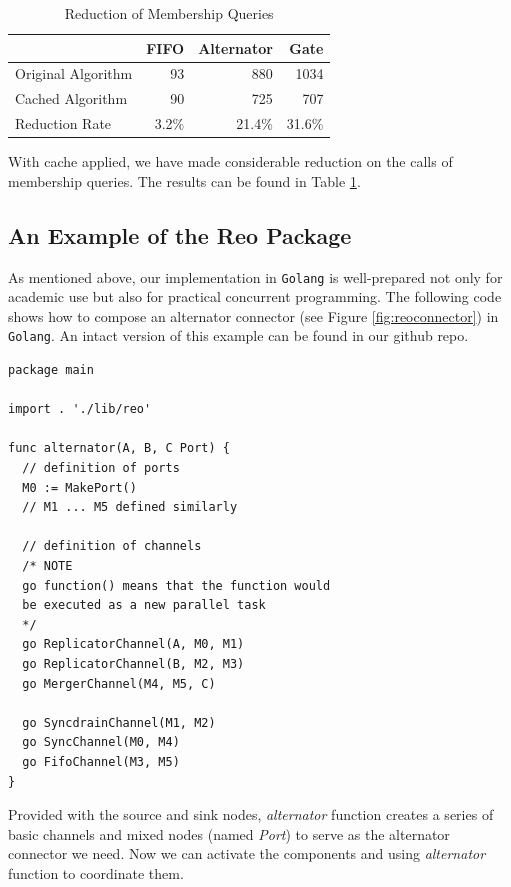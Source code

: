 \documentclass[conference, a4paper]{IEEEtran}
\begin{document}
\begin{table}[ht]
  \renewcommand{\arraystretch}{1.3}
  \caption{Reduction of Membership Queries}
  \label{tabel:cacheoptimization}
  \centering
  \begin{tabular}{l||rrr}
    \hline
    & FIFO & Alternator & Gate \\
    \hline\hline
    Original Algorithm & 93 & 880 & 1034 \\
    Cached Algorithm & 90 & 725 & 707 \\
    Reduction Rate & 3.2\% & 21.4\% & 31.6\% \\
    \hline
  \end{tabular}
\end{table}

With cache applied, we have made considerable reduction on the calls of membership queries. The results
can be found in Table \ref{tabel:cacheoptimization}.

\subsection{An Example of the Reo Package }
\label{sec:reolib}

As mentioned above, our implementation in \texttt{Golang} is well-prepared not only for academic use
but also for practical concurrent programming. The following code shows how to compose an alternator
connector (see Figure \ref{fig:reoconnector}) in \texttt{Golang}. An intact version of this example can be found in our github repo.

\begin{lstlisting}
package main

import . './lib/reo'

func alternator(A, B, C Port) {
  // definition of ports
  M0 := MakePort()
  // M1 ... M5 defined similarly

  // definition of channels
  /* NOTE
  go function() means that the function would
  be executed as a new parallel task
  */
  go ReplicatorChannel(A, M0, M1)
  go ReplicatorChannel(B, M2, M3)
  go MergerChannel(M4, M5, C)

  go SyncdrainChannel(M1, M2)
  go SyncChannel(M0, M4)
  go FifoChannel(M3, M5)
}
\end{lstlisting}

Provided with the source and sink nodes, \emph{alternator} function creates a series of basic
channels and mixed nodes (named \emph{Port}) to serve as the alternator connector we need. Now we
can activate the components and using \emph{alternator} function to coordinate them.
\end{document}
